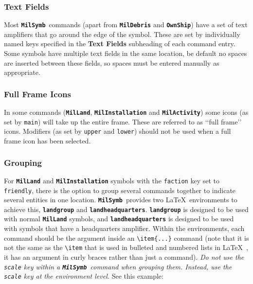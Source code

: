 \documentclass[a4paper, titlepage]{article}
\newcommand\MilSymb{\textbf{\texttt{MilSymb}}}
\begin{document}
\subsubsection{Text Fields}

Most \MilSymb\ commands (apart from \textbf{\texttt{MilDebris}} and \textbf{\texttt{OwnShip}}) have a set of text amplifiers that go around the edge of the symbol. These are set by individually named keys specified in the \textbf{Text Fields} subheading of each command entry. Some symbols have multiple text fields in the same location, be default no spaces are inserted between these fields, so spaces must be entered manually as appropriate.

\subsubsection{Full Frame Icons}

In some commands (\textbf{\texttt{MilLand}}, \textbf{\texttt{MilInstallation}} and \textbf{\texttt{MilActivity}}) some icons (as set by \texttt{main}) will take up the entire frame. These are referred to as \lq\lq{}full frame\rq\rq{} icons. Modifiers (as set by \texttt{upper} and \texttt{lower}) should not be used when a full frame icon has been selected.

\subsubsection{Grouping}

For \textbf{\texttt{MilLand}} and \textbf{\texttt{MilInstallation}} symbols with the \texttt{faction} key set to \texttt{friendly}, there is the option to group several commands together to indicate several entities in one location. \MilSymb\  provides two \LaTeX\ environments to achieve this, \textbf{\texttt{landgroup}} and \textbf{\texttt{landheadquarters}}.  \textbf{\texttt{landgroup}} is designed to be used with normal \textbf{\texttt{MilLand}} symbols, and \textbf{\texttt{landheadquarters}} is designed to be used with symbols that have a headquarters amplifier. Within the environments, each command should be the argument inside an \texttt{\textbackslash item\{...\}} command (note that it is not the same as the \texttt{\textbackslash item} that is used in bulleted and numbered lists in \LaTeX\ , it has an argument in curly braces rather than just a command). \textit{Do not use the \texttt{scale} key within a \MilSymb\ command when grouping them. Instead, use the \texttt{scale} key at the environment level.} See this example:\\
\end{document}
